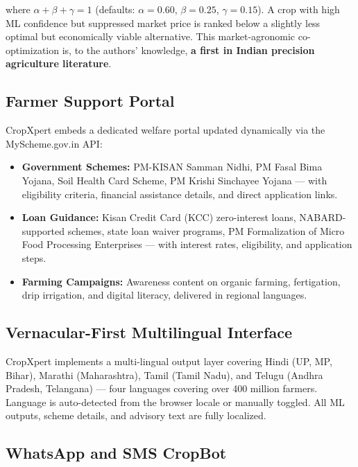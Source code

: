 \documentclass[10pt,twocolumn]{article}
\begin{document}
where $\alpha + \beta + \gamma = 1$ (defaults: $\alpha=0.60$, $\beta=0.25$, $\gamma=0.15$). A crop with high ML confidence but suppressed market price is ranked below a slightly less optimal but economically viable alternative. This market-agronomic co-optimization is, to the authors' knowledge, \textbf{a first in Indian precision agriculture literature}.

\subsection{Farmer Support Portal}

CropXpert embeds a dedicated welfare portal updated dynamically via the MyScheme.gov.in API:

\begin{itemize}[leftmargin=1.2em, itemsep=2pt]
    \item \textbf{Government Schemes:} PM-KISAN Samman Nidhi, PM Fasal Bima Yojana, Soil Health Card Scheme, PM Krishi Sinchayee Yojana --- with eligibility criteria, financial assistance details, and direct application links.
    \item \textbf{Loan Guidance:} Kisan Credit Card (KCC) zero-interest loans, NABARD-supported schemes, state loan waiver programs, PM Formalization of Micro Food Processing Enterprises --- with interest rates, eligibility, and application steps.
    \item \textbf{Farming Campaigns:} Awareness content on organic farming, fertigation, drip irrigation, and digital literacy, delivered in regional languages.
\end{itemize}

\subsection{Vernacular-First Multilingual Interface}

CropXpert implements a multi-lingual output layer covering Hindi (UP, MP, Bihar), Marathi (Maharashtra), Tamil (Tamil Nadu), and Telugu (Andhra Pradesh, Telangana) --- four languages covering over 400 million farmers. Language is auto-detected from the browser locale or manually toggled. All ML outputs, scheme details, and advisory text are fully localized.

\subsection{WhatsApp and SMS CropBot}
\end{document}
